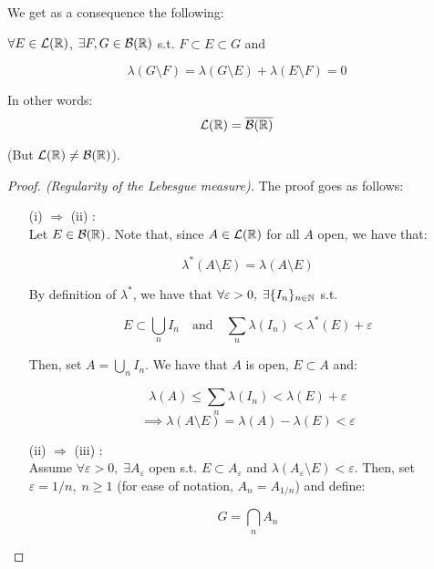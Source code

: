 \vspace{1em}

We get as a consequence the following:

\begin{fcorollary}
    $\forall E \in \mathcal{L}(\mathbb{R})$, $\exists F, G \in \mathcal{B}(\mathbb{R})$ s.t. $F \subset E \subset G$ and

    $$\lambda(G \setminus F) = \lambda(G \setminus E) + \lambda(E \setminus F) = 0$$

    In other words:
     $$\mathcal{L}(\mathbb{R}) = \overline{\mathcal{B}(\mathbb{R})}$$ 
     
    (But $\mathcal{L}(\mathbb{R}) \neq \mathcal{B}(\mathbb{R})$).

\end{fcorollary}

\begin{proof}[Proof. (Regularity of the Lebesgue measure)]
    The proof goes as follows:

    \begin{enumerate}
        \item[(i) $\Rightarrow$ (ii)]: \\
        
        Let $E \in \mathcal{B}(\mathbb{R})$. Note that, since $A \in \mathcal{L}(\mathbb{R})$ for all $A$ open, we have that:

        $$\lambda^{*}(A \setminus E) = \lambda(A \setminus E)$$

        By definition of $\lambda^{*}$, we have that 
        $\forall \varepsilon > 0, \; \exists \{I_n\}_{n \in \mathbb{N}}$ s.t.

        $$E \subset \bigcup_{n} I_n \quad \text{and} \quad \sum_{n} \lambda(I_n) < \lambda^{*}(E) + \varepsilon$$

        Then, set $A = \bigcup_{n} I_n$. We have that $A$ is open, $E \subset A$ and:

        $$\lambda(A) \leq \sum_{n} \lambda(I_n) < \lambda(E) + \varepsilon$$
        $$\implies \lambda(A \setminus E) = \lambda(A) - \lambda(E)  < \varepsilon$$

        \item[(ii) $\Rightarrow$ (iii)]: \\
        
        Assume $\forall \varepsilon > 0, \; \exists A_\varepsilon$ open s.t. $E \subset A_\varepsilon$ and
        $\lambda(A_\varepsilon \setminus E) < \varepsilon$. Then, set $\varepsilon = 1/n, \; n \geq 1$ 
        (for ease of notation, $A_n = A_{1/n}$) and define:

        $$G = \bigcap_{n} A_{n}$$


\end{enumerate}
\end{proof}
